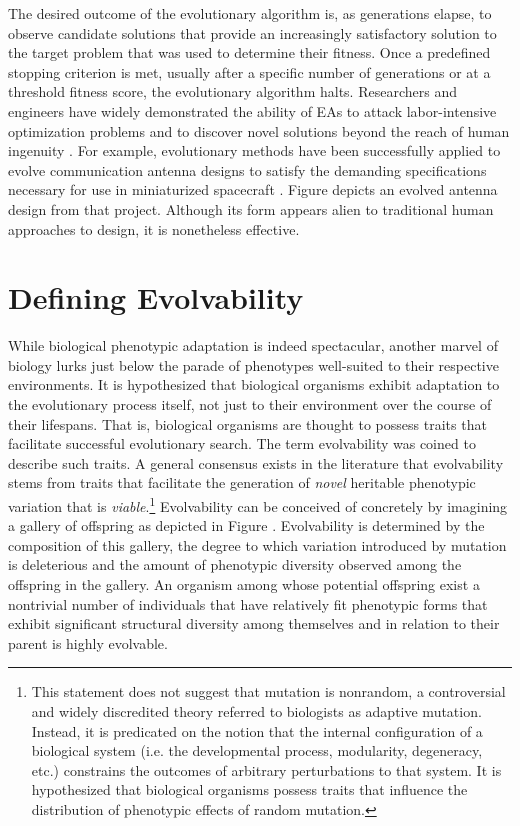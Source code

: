 The desired outcome of the evolutionary algorithm is, as generations elapse, to observe candidate solutions that provide an increasingly satisfactory solution to the target problem that was used to determine their fitness.
Once a predefined stopping criterion is met, usually after a specific number of generations or at a threshold fitness score, the evolutionary algorithm halts.
Researchers and engineers have widely demonstrated the ability of EAs to attack labor-intensive optimization problems and to discover novel solutions beyond the reach of human ingenuity \cite{Poli2008AProgramming}.
For example, evolutionary methods have been successfully applied to evolve communication antenna designs to satisfy the demanding specifications necessary for use in miniaturized spacecraft  \cite{Hornby2006AutomatedAlgorithms}.
Figure  depicts an evolved antenna design from that project. Although its form appears alien to traditional human approaches to design, it is nonetheless effective.


\section{Defining Evolvability}

While biological phenotypic adaptation is indeed spectacular, another marvel of biology lurks just below the parade of phenotypes well-suited to their respective environments.
It is hypothesized that biological organisms exhibit adaptation to the evolutionary process itself, not just to their environment over the course of their lifespans.
That is, biological organisms are thought to possess traits that facilitate successful evolutionary search.
The term evolvability was coined to describe such traits.
A general consensus exists in the literature that evolvability stems from traits that facilitate the generation of \textit{novel} heritable phenotypic variation that is \textit{viable}.\footnote
{This statement does not suggest that mutation is nonrandom, a controversial and widely discredited theory referred to biologists as adaptive mutation.
Instead, it is predicated on the notion that the internal configuration of a biological system (i.e. the developmental process, modularity, degeneracy, etc.) constrains the outcomes of arbitrary perturbations to that system.
It is hypothesized that biological organisms possess traits that influence the distribution of phenotypic effects of random mutation.}
Evolvability can be conceived of concretely by imagining a gallery of offspring as depicted in Figure .
Evolvability is determined by the composition of this gallery, the degree to which variation introduced by mutation is deleterious and the amount of phenotypic diversity observed among the offspring in the gallery. 
An organism among whose potential offspring exist a nontrivial number of individuals that have relatively fit phenotypic forms that exhibit significant structural diversity among themselves and in relation to their parent is highly evolvable. 

